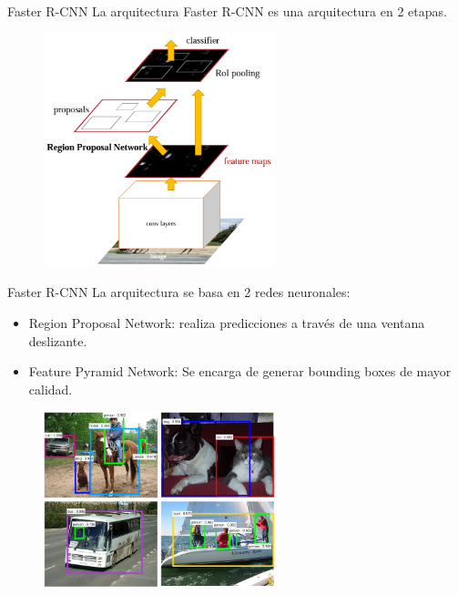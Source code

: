 \begin{frame}{Faster R-CNN}
La arquitectura \alert{Faster R-CNN}\cite{ren2015faster} es una arquitectura en \alert{2 etapas}.

\begin{figure}
    \centering
    \includegraphics[width=0.6\textwidth]{figures/Tema 4/FasterRCNN.png}
    \caption{\cite{ren2015faster}}
\end{figure}
\end{frame}

\begin{frame}{Faster R-CNN}
La arquitectura se basa en \alert{2 redes neuronales}:
\begin{itemize}
    \item \alert{Region Proposal Network}: realiza predicciones a través de una \alert{ventana deslizante}.
    \item \alert{Feature Pyramid Network}: Se encarga de generar bounding boxes de mayor calidad.
\end{itemize}

\begin{figure}
    \centering
    \includegraphics[width=0.6\textwidth]{figures/Tema 4/FasterRCNN_Results.png}
    \caption{\cite{ren2015faster}}
\end{figure}
\end{frame}


